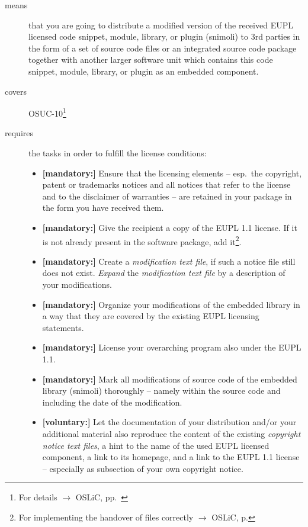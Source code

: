 \begin{description}
\item[means] that you are going to distribute a modified version of the received
EUPL licensed code snippet, module, library, or plugin (snimoli) to 3rd
parties in the form of a set of source code files or an integrated source code
package together with another larger software unit which contains this code
snippet, module, library, or plugin as an embedded component.
\item[covers] OSUC-10\footnote{For details $\rightarrow$ OSLiC, pp.\ \pageref{OSUC-10-DEF}}
\item[requires] the tasks in order to fulfill the license conditions:
\begin{itemize}

  \item \textbf{[mandatory:]} Ensure that the licensing elements -- esp.\ the
  copyright, patent or trademarks notices and all notices that refer to the
  license and to the disclaimer of warranties -- are retained in your package in
  the form you have received them.

  \item \textbf{[mandatory:]} Give the recipient a copy of the EUPL 1.1
  license. If it is not already present in the software package, add
  it\footnote{For implementing the handover of files correctly $\rightarrow$
  OSLiC, p. \pageref{DistributingFilesHint}}.

  \item \textbf{[mandatory:]} Create a \emph{modification text file}, if such a
  notice file still does not exist. \emph{Expand} the \emph{modification text
  file} by a description of your modifications.
  
  \item \textbf{[mandatory:]} Organize your modifications of the embedded
  library in a way that they are covered by the existing EUPL licensing
  statements. 
  
  \item \textbf{[mandatory:]} License your overarching program also under the
  EUPL 1.1.
  
  \item \textbf{[mandatory:]} Mark all modifications of source code of the
  embedded library (snimoli) thoroughly --
  namely within the source code and including the date of the modification.
  
  \item \textbf{[voluntary:]} Let the documentation of your distribution and/or
  your additional material  also reproduce the content of the existing
  \emph{copyright notice text files}, a hint to the name of the used EUPL
  licensed component, a link to its homepage, and a link to the EUPL 1.1 license
  -- especially as subsection of your own copyright notice.
 

\end{itemize}
\end{description}
